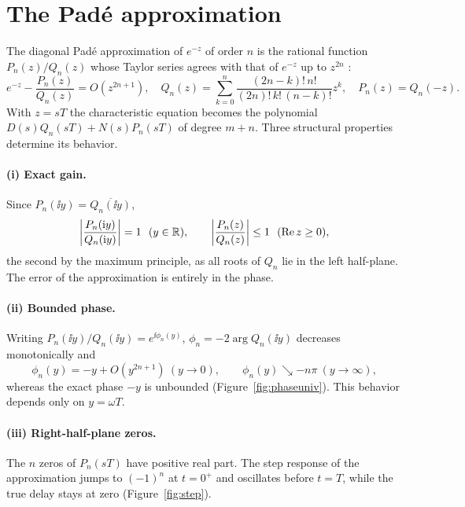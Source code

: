\section{The Padé approximation}\label{sec:pade}

The diagonal Padé approximation of $e^{-z}$ of order $n$ is the rational
function $P_n(z)/Q_n(z)$ whose Taylor series agrees with that of $e^{-z}$
up to $z^{2n}$ \citep{baker1996}:
\begin{equation}
  e^{-z}-\frac{P_n(z)}{Q_n(z)}=O(z^{2n+1}),\quad
  Q_n(z)=\sum_{k=0}^n\frac{(2n-k)!\,n!}{(2n)!\,k!\,(n-k)!}z^k,\quad
  P_n(z)=Q_n(-z).
  \label{eq:pade}
\end{equation}
With $z=sT$ the characteristic equation becomes the polynomial
$D(s)Q_n(sT)+N(s)P_n(sT)$ of degree $m+n$. Three structural properties
determine its behavior.

\paragraph{(i) Exact gain.} Since $P_n(\ii y)=\overline{Q_n(\ii y)}$,
\begin{equation}
  \left|\frac{P_n(\mathrm{i} y)}{Q_n(\mathrm{i} y)}\right|=1\ \ (y\in\mathbb R),\qquad
  \left|\frac{P_n(z)}{Q_n(z)}\right|\le1\ \ (\operatorname{Re} z\ge0),
  \label{eq:allpass}
\end{equation}
the second by the maximum principle, as all roots of $Q_n$ lie in the left
half-plane. The error of the approximation is entirely in the phase.

\paragraph{(ii) Bounded phase.} Writing $P_n(\ii y)/Q_n(\ii y)=e^{\ii\phi_n(y)}$,
$\phi_n=-2\arg Q_n(\ii y)$ decreases monotonically and
\begin{equation}
  \phi_n(y)=-y+O(y^{2n+1})\ (y\to0),\qquad \phi_n(y)\searrow-n\pi\ (y\to\infty),
  \label{eq:phase}
\end{equation}
whereas the exact phase $-y$ is unbounded (Figure~\ref{fig:phaseuniv}).
This behavior depends only on $y=\omega T$.

\paragraph{(iii) Right-half-plane zeros.} The $n$ zeros of $P_n(sT)$ have
positive real part. The step response of the approximation jumps to
$(-1)^n$ at $t=0^+$ and oscillates before $t=T$, while the true delay stays
at zero (Figure~\ref{fig:step}).

